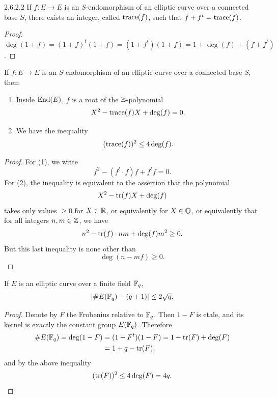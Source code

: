 \begin{customcor}{2.6.2.2}\label{cor:2.6.2.2}
If $f : E \to E$ is an $S$-endomorphism of an elliptic curve over a connected base $S$, there exists an integer, called $\operatorname{trace}(f)$, such that $f + f^t = \operatorname{trace}(f)$.
\end{customcor}

\begin{proof}
$\deg(1+f) = (1+f)^t(1+f) = (1+f^t)(1+f) = 1 + \deg(f) + (f+f^t)$.
\end{proof}

\begin{theorem}\label{thm:2.6.3}
If $f : E \to E$ is an $S$-endomorphism of an elliptic curve over a connected base $S$, then:
\begin{enumerate}
\item[(1)] Inside $\operatorname{End}(E)$, $f$ is a root of the $\mathbb{Z}$-polynomial
\[
X^2 - \operatorname{trace}(f)X + \deg(f) = 0.
\]
\item[(2)] We have the inequality
\[
(\operatorname{trace}(f))^2 \le 4 \deg(f).
\]
\end{enumerate}
\end{theorem}

\begin{proof}
For (1), we write
\[
f^2 - (f^t \cdot f)f + f^t f = 0.
\]
For (2), the inequality is equivalent to the assertion that the polynomial
\[
X^2 - \operatorname{tr}(f)X + \deg(f)
\]
takes only values $\ge 0$ for $X \in \mathbb{R}$, or equivalently for $X \in \mathbb{Q}$, or equivalently that for all integers $n, m \in \mathbb{Z}$, we have
\[
n^2 - \operatorname{tr}(f) \cdot nm + \deg(f)m^2 \ge 0.
\]
But this last inequality is none other than
\[
\deg(n - mf) \ge 0.
\]
\end{proof}

\begin{corollary}\label{cor:2.6.4}
If $E$ is an elliptic curve over a finite field $\mathbb{F}_q$,
\[
|\#E(\mathbb{F}_q) - (q+1)| \le 2\sqrt{q}.
\]
\end{corollary}

\begin{proof}
Denote by $F$ the Frobenius relative to $\mathbb{F}_q$. Then $1 - F$ is etale, and its kernel is exactly the constant group $E(\mathbb{F}_q)$. Therefore
\[
\begin{aligned}
\#E(\mathbb{F}_q) = \deg(1-F) &= (1-F^t)(1-F) = 1 - \operatorname{tr}(F) + \deg(F) \\
&= 1 + q - \operatorname{tr}(F),
\end{aligned}
\]
and by the above inequality
\[
(\operatorname{tr}(F))^2 \le 4 \deg(F) = 4q.
\]
\end{proof}


